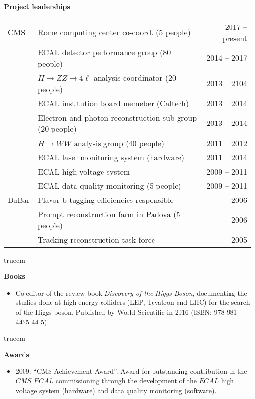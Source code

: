 \documentclass[11pt,twoside,a4paper]{article}
\begin{document}
\newpage

\begin{center}
{\bf{Project leaderships}}
\end{center}

\begin{tabular}{llr}
CMS & Rome computing center co-coord. (5 people) & 2017 -- present \\
    & ECAL detector performance group (80 people) & 2014 -- 2017 \\
    & $H \to ZZ\to4\ell$ analysis coordinator (20 people) & 2013 -- 2104 \\
    & ECAL institution board memeber (Caltech) & 2013 -- 2014 \\
    & Electron and photon reconstruction sub-group (20 people) & 2013 -- 2014 \\
    & $H \to WW$ analysis group (40 people) & 2011 -- 2012 \\
    & ECAL laser monitoring system (hardware) & 2011 -- 2014 \\
    & ECAL high voltage system & 2009 -- 2011 \\
    & ECAL data quality monitoring (5 people) & 2009 -- 2011 \\
BaBar & Flavor b-tagging efficiencies responsible & 2006 \\
      & Prompt reconstruction farm in Padova (5 people) & 2006 \\
      & Tracking reconstruction task force & 2005 \\
\end{tabular}

 truecm

\begin{center}
{\bf{Books}}
\end{center}

\begin{itemize}
\item Co-editor of the review book {\it Discovery of the
  Higgs Boson}, documenting the studies done at high energy colliders
  (LEP, Tevatron and LHC) for the search of the Higgs boson. Published
  by World Scientific in 2016 (ISBN: 978-981-4425-44-5).
\end{itemize}


 truecm


\begin{center}
  {\bf{Awards}}
\end{center}

\begin{itemize}
\item 2009: ``CMS Achievement Award''. Award for outstanding
  contribution in the $CMS$ $ECAL$ commissioning through the
  development of the $ECAL$ high voltage system (hardware) and data
  quality monitoring (software).
\end{itemize}
\end{document}
